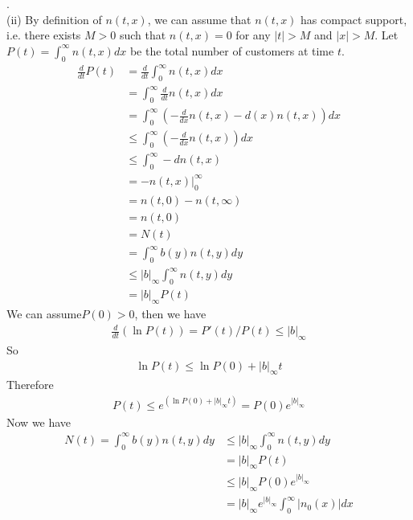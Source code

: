 \documentclass[pdf]{article}
\begin{document}
.\\
(ii) By definition of $n(t, x)$, we can assume that $n(t, x)$ has compact support, i.e. there exists $M>0$ such that $n(t, x)=0$ for any $|t|>M$ and $|x|>M$. Let $P(t) = \int_0^\infty n(t,x)dx$ be the total number of customers at time $t$. 
\begin{align*}
\frac{d}{dt}P(t) &= \frac{d}{dt}\int_0^\infty n(t,x)dx\\
                           &= \int_0^\infty \frac{d}{dt}n(t,x)dx\\
                           &= \int_0^\infty (-\frac{d}{dx}n(t,x) - d(x)n(t,x))dx\\
                           &\leq \int_0^\infty (-\frac{d}{dx}n(t,x))dx\\
                           &\leq \int_0^\infty -dn(t,x)\\
                           &= -n(t,x)|_0^\infty\\
                           &= n(t,0) - n(t,\infty)\\
                           &= n(t,0)\\
                           &= N(t)\\
                           &= \int_0^\infty b(y)n(t,y)dy\\
                           &\leq |b|_\infty\int_0^\infty n(t,y)dy\\
                           &= |b|_\infty P(t)
\end{align*}
We can assume$P(0) > 0$, then we have
\begin{align*}
\frac{d}{dt}(\ln P(t)) = P'(t)/P(t) \leq |b|_\infty 
\end{align*}
So
\begin{align*}
\ln P(t) \leq \ln P(0) + |b|_\infty t
\end{align*}
Therefore
\begin{align*}
P(t) \leq e^{(\ln P(0) + |b|_\infty t)} = P(0)e^{|b|_\infty}
\end{align*}
Now we have
\begin{align*}
N(t) =  \int_0^\infty b(y)n(t,y)dy & \leq  |b|_\infty\int_0^\infty n(t,y)dy\\
                                                       & =  |b|_\infty P(t)\\
                                                       & \leq  |b|_\infty P(0)e^{|b|_\infty}\\
                                                       & =  |b|_\infty e^{|b|_\infty}\int_0^\infty |n_0(x)|dx\\
\end{align*}
\end{document}
